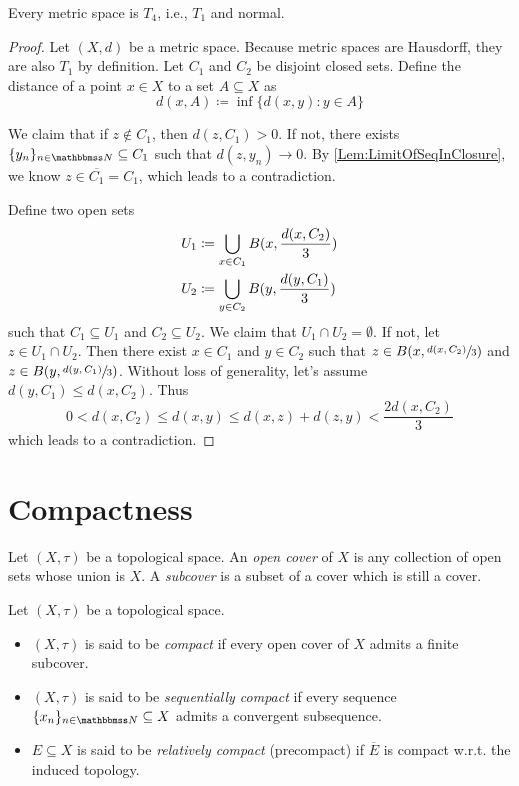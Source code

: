 \documentclass[screen,single]{techreport}
\numberwithin{equation}{section}
\begin{document}
\begin{proposition}\label{Prop:MetricT4}
	Every metric space is $T_4$, i.e., $T_1$ and normal.
\end{proposition}
\begin{proof}
	Let $(X,d)$ be a metric space.
	Because metric spaces are Hausdorff, they are also $T_1$ by definition.
	Let $C_1$ and $C_2$ be disjoint closed sets.
	Define the distance of a point $x \in X$ to a set $A \subseteq X$ as
	\[
	d(x,A) \coloneqq \inf \{ d(x,y) : y \in A \}
	\]
	
	We claim that if $z \not\in C_1$, then $d(z,C_1) > 0$.
	If not, there exists $\{y_n\}_{n \in \bbN} \subseteq C_1$ such that $d(z,y_n) \rightarrow 0$.
	By \cref{Lem:LimitOfSeqInClosure}, we know $z \in \overline{C_1} = C_1$, which leads to a contradiction.
	
	Define two open sets
	\begin{align*}
		U_1 & \coloneqq \bigcup_{x \in C_1} B({x,\frac{d(x,C_2)}{3}}) \\
		U_2 & \coloneqq \bigcup_{y \in C_2} B({y,\frac{d(y,C_1)}{3}})
	\end{align*}
	such that $C_1 \subseteq U_1$ and $C_2 \subseteq U_2$.
	We claim that $U_1 \cap U_2 = \emptyset$.
	If not, let $z \in U_1 \cap U_2$.
	Then there exist $x \in C_1$ and $y \in C_2$ such that $z \in B(x,\sfrac{d(x,C_2)}{3})$ and $z \in B(y,\sfrac{d(y,C_1)}{3})$.
	Without loss of generality, let's assume $d(y,C_1) \le d(x,C_2)$.
	Thus
	\[
	0 < d(x,C_2) \le d(x,y) \le d(x,z)+d(z,y) < \frac{2d(x,C_2)}{3}
	\]
	which leads to a contradiction.
\end{proof}

\section{Compactness}

\begin{definition}\label{De:Covers}
	Let $(X,\tau)$ be a topological space.
	An \emph{open cover} of $X$ is any collection of open sets whose union is $X$.
	A \emph{subcover} is a subset of a cover which is still a cover.
\end{definition}

\begin{definition}\label{De:CompactSpace}
	Let $(X,\tau)$ be a topological space.
	\begin{itemize}
		\item $(X,\tau)$ is said to be \emph{compact} if every open cover of $X$ admits a finite subcover.
		\item $(X,\tau)$ is said to be \emph{sequentially compact} if every sequence $\{x_n\}_{n \in \bbN} \subseteq X$ admits a convergent subsequence.
		\item $E \subseteq X$ is said to be \emph{relatively compact} (precompact) if $\overline{E}$ is compact w.r.t. the induced topology.
	\end{itemize}
\end{definition}
\end{document}
